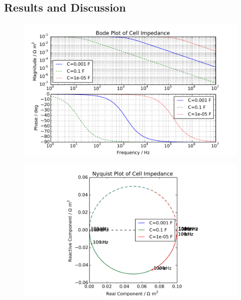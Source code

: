 \subsection{Results and Discussion}

\begin{figure}[htbp]
  \includegraphics[width=\linewidth]{Results/Cell/Model/Linearization/Bode}%
  \caption{}%
  \label{fig:}
\end{figure}

\begin{figure}[htbp]
  \includegraphics[width=\linewidth]{Results/Cell/Model/Linearization/Nyquist}%
  \caption{}%
  \label{fig:}
\end{figure}


